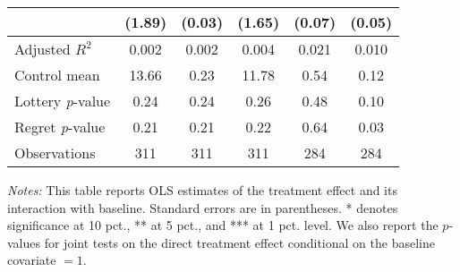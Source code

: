 \begin{table}[h]
{\begin{threeparttable}
\begin{tabular}{l*{5}{c}}
                &   (1.89)         &   (0.03)         &   (1.65)         &   (0.07)         &   (0.05)         \\
\midrule
Adjusted \(R^{2}\)&    0.002         &    0.002         &    0.004         &    0.021         &    0.010         \\
Control mean    &    13.66         &     0.23         &    11.78         &     0.54         &     0.12         \\
Lottery \emph{p}-value&     0.24         &     0.24         &     0.26         &     0.48         &     0.10         \\
Regret \emph{p}-value&     0.21         &     0.21         &     0.22         &     0.64         &     0.03         \\
Observations    &      311         &      311         &      311         &      284         &      284         \\
\bottomrule \end{tabular} \begin{tablenotes}[flushleft] \footnotesize \item \emph{Notes:} This table reports OLS estimates of the treatment effect and its interaction with baseline. Standard errors are in parentheses. * denotes significance at 10 pct., ** at 5 pct., and *** at 1 pct. level. We also report the \(p\)-values for joint tests on the direct treatment effect conditional on the baseline covariate $= 1$. \end{tablenotes} \end{threeparttable} } \end{table}

